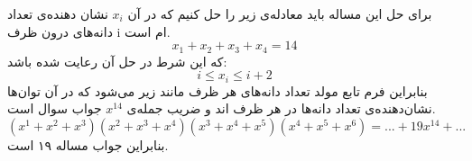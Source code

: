         \p
        برای حل این مساله باید معادله‌ی زیر را حل کنیم که در آن \(x_i\) نشان دهنده‌ی  تعداد دانه‌های درون ظرف i ام است.
        \[x_{1} + x_{2} + x_{3} + x_{4} = 14 \]که این شرط در حل آن رعایت شده باشد:
        \[i \leq x_{i} \leq i+2\]بنابراین فرم تابع مولد تعداد دانه‌های هر ظرف مانند زیر می‌شود که در آن توان‌ها نشان‌دهنده‌ی تعداد دانه‌ها در هر ظرف اند و ضریب جمله‌ی \(x^{14}\) جواب سوال است.
        \[ (x^1 + x^2 + x^3)(x^2 + x^3 + x^4)(x^3 + x^4 + x^5)(x^4 + x^5 + x^6) = ... + 19x^{14} + ... \]بنابراین جواب مساله ۱۹ است.